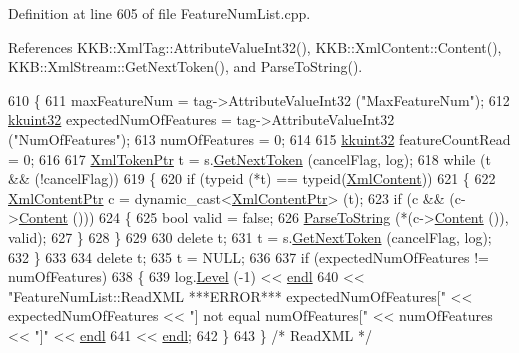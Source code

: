 Definition at line 605 of file Feature\+Num\+List.\+cpp.



References K\+K\+B\+::\+Xml\+Tag\+::\+Attribute\+Value\+Int32(), K\+K\+B\+::\+Xml\+Content\+::\+Content(), K\+K\+B\+::\+Xml\+Stream\+::\+Get\+Next\+Token(), and Parse\+To\+String().


\begin{DoxyCode}
610 \{
611   maxFeatureNum = tag->AttributeValueInt32 (\textcolor{stringliteral}{"MaxFeatureNum"});
612   \hyperlink{namespace_k_k_b_af8d832f05c54994a1cce25bd5743e19a}{kkuint32} expectedNumOfFeatures = tag->AttributeValueInt32 (\textcolor{stringliteral}{"NumOfFeatures"});
613   numOfFeatures = 0;
614 
615   \hyperlink{namespace_k_k_b_af8d832f05c54994a1cce25bd5743e19a}{kkuint32} featureCountRead = 0;
616 
617   \hyperlink{class_k_k_b_1_1_xml_token}{XmlTokenPtr}  t = s.\hyperlink{class_k_k_b_1_1_xml_stream_a87cc738b05c666cf5d5c25beaab477b4}{GetNextToken} (cancelFlag, log);
618   \textcolor{keywordflow}{while}  (t  &&  (!cancelFlag))
619   \{
620     \textcolor{keywordflow}{if}  (\textcolor{keyword}{typeid} (*t) == \textcolor{keyword}{typeid}(\hyperlink{class_k_k_b_1_1_xml_content}{XmlContent}))
621     \{
622       \hyperlink{class_k_k_b_1_1_xml_content}{XmlContentPtr} c = \textcolor{keyword}{dynamic\_cast<}\hyperlink{class_k_k_b_1_1_xml_content}{XmlContentPtr}\textcolor{keyword}{>} (t);
623       \textcolor{keywordflow}{if}  (c  &&  (c->\hyperlink{class_k_k_b_1_1_xml_content_a1d0730aae45b069e8604bef19b8c0098}{Content} ()))
624       \{
625         \textcolor{keywordtype}{bool}  valid = \textcolor{keyword}{false};
626         \hyperlink{class_k_k_m_l_l_1_1_feature_num_list_a7cb87eaf9d3ae1a492e9106f3d69897c}{ParseToString} (*(c->\hyperlink{class_k_k_b_1_1_xml_content_a1d0730aae45b069e8604bef19b8c0098}{Content} ()), valid);
627       \}
628     \}
629 
630     \textcolor{keyword}{delete}  t;
631     t = s.\hyperlink{class_k_k_b_1_1_xml_stream_a87cc738b05c666cf5d5c25beaab477b4}{GetNextToken} (cancelFlag, log);
632   \}
633 
634   \textcolor{keyword}{delete}  t;
635   t = NULL;
636 
637   \textcolor{keywordflow}{if}  (expectedNumOfFeatures != numOfFeatures)
638   \{
639     log.\hyperlink{class_k_k_b_1_1_run_log_a32cf761d7f2e747465fd80533fdbb659}{Level} (-1) << \hyperlink{namespace_k_k_b_ad1f50f65af6adc8fa9e6f62d007818a8}{endl}
640       << \textcolor{stringliteral}{"FeatureNumList::ReadXML   ***ERROR***   expectedNumOfFeatures["}  << expectedNumOfFeatures << \textcolor{stringliteral}{"] 
       not equal  numOfFeatures["} << numOfFeatures << \textcolor{stringliteral}{"]"} << \hyperlink{namespace_k_k_b_ad1f50f65af6adc8fa9e6f62d007818a8}{endl}
641       << \hyperlink{namespace_k_k_b_ad1f50f65af6adc8fa9e6f62d007818a8}{endl};
642   \}
643 \}  \textcolor{comment}{/* ReadXML */}
\end{DoxyCode}
